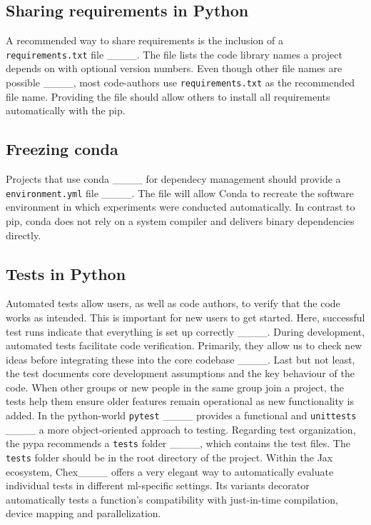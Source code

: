\subsection{Sharing requirements in Python}
A recommended way to share requirements is the inclusion of a \texttt{requirements.txt} file 
____. The file lists the code library names a project depends on
with optional version numbers. Even though other file names are possible
____, most code-authors use \texttt{requirements.txt} as the recommended file name. Providing the file should allow others to install all requirements automatically with the \ac{pip}.

\subsection{Freezing conda}
Projects that use conda ____ for dependecy management should
provide a \texttt{environment.yml} file ____.
The file will allow Conda to recreate the software environment in which experiments were conducted automatically. In contrast to \ac{pip}, conda does not rely on a system compiler and delivers binary dependencies directly.

\subsection{Tests in Python}
Automated tests allow users, as well as code authors, to verify that the code works as intended.
This is important for new users to get started. Here, successful test runs indicate that everything is set up correctly ____.
During development, automated tests facilitate code verification. Primarily, they allow us
to check new ideas before integrating these into the core codebase ____.
Last but not least, the test documents core development assumptions and the key behaviour of the code.
When other groups or new people in the same group join a project, the tests help them ensure older features remain operational as new functionality is added. 
In the python-world \texttt{pytest} ____ provides a functional and
\texttt{unittests} ____ a more object-oriented approach to testing.
Regarding test organization, the \ac{pypa} recommends a \texttt{tests} folder ____,
which contains the test files. The \texttt{tests} folder should be in the root directory of the project.
Within the Jax ecosystem, Chex____ offers a very elegant way to automatically evaluate individual tests in different \ac{ml}-specific settings.
Its variants decorator automatically tests a function's compatibility with just-in-time compilation, device mapping and parallelization.

